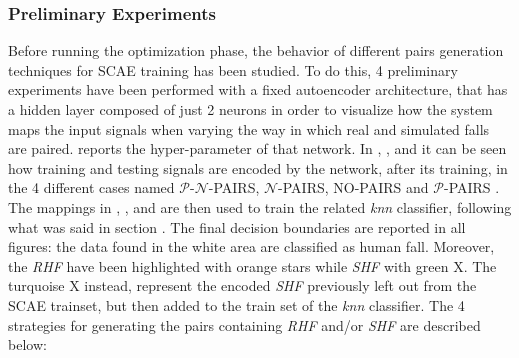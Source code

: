 \subsubsection{Preliminary Experiments}
\label{sec:preliminary_experiments}
Before running the optimization phase, the behavior of different pairs generation techniques for SCAE training has been studied. To do this, 4 preliminary experiments have been performed with a fixed autoencoder architecture, that has a hidden layer composed of just 2 neurons in order to visualize how the system maps the input signals when varying the way in which real and simulated falls are paired.  reports the hyper-parameter of that network. In , ,  and  it can be seen how training and testing signals are encoded by the network, after its training, in the 4 different cases named $\mathcal{P}$-$\mathcal{N}$-PAIRS, $\mathcal{N}$-PAIRS, NO-PAIRS and $\mathcal{P}$-PAIRS  .
The mappings in , ,  and  are then used to train the related \textit{knn} classifier, following what was said in section . The final decision boundaries are reported in all figures: the data found in the white area are classified as human fall. Moreover, the \textit{RHF} have been highlighted with orange stars while \textit{SHF} with green X. The turquoise X instead, represent the encoded \textit{SHF} previously left out from the SCAE trainset, but then added to the train set of the \textit{knn} classifier.
The 4 strategies for generating the pairs containing \textit{RHF} and/or \textit{SHF} are described below:
